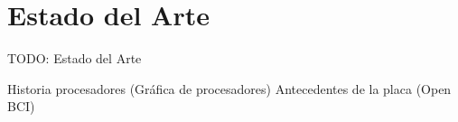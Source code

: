 \chapter{Estado del Arte\label{sec:EstadoDelArte}}

TODO: Estado del Arte

Historia procesadores (Gráfica de procesadores)
Antecedentes de la placa (Open BCI)